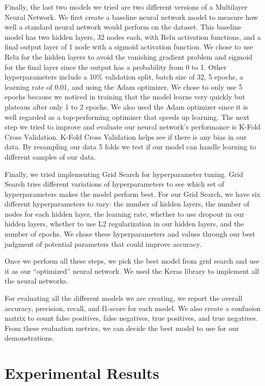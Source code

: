 \documentclass[a4paper]{article}
\begin{document}
Finally, the last two models we tried are two different versions of a Multilayer Neural Network. We first create a baseline neural network model to measure how well a standard neural network would perform on the dataset. This baseline model has two hidden layers, 32 nodes each, with Relu activation functions, and a final output layer of 1 node with a sigmoid activation function. We chose to use Relu for the hidden layers to avoid the vanishing gradient problem and sigmoid for the final layer since the output has a probability from 0 to 1. Other hyperparameters include a 10\% validation split, batch size of 32, 5 epochs, a learning rate of 0.01, and using the Adam optimizer. We chose to only use 5 epochs because we noticed in training that the model learns very quickly but plateaus after only 1 to 2 epochs. We also used the Adam optimizer since it is well regarded as a top-performing optimizer that speeds up learning.
The next step we tried to improve and evaluate our neural network’s performance is K-Fold Cross Validation. K-Fold Cross Validation helps see if there is any bias in our data. By resampling our data 5 folds we test if our model can handle learning to different samples of our data.

Finally, we tried implementing Grid Search for hyperparameter tuning. Grid Search tries different variations of hyperparameters to see which set of hyperparameters makes the model perform best. For our Grid Search, we have six different hyperparameters to vary: the number of hidden layers, the number of nodes for each hidden layer, the learning rate, whether to use dropout in our hidden layers, whether to use L2 regularization in our hidden layers, and the number of epochs. We chose these hyperparameters and values through our best judgment of potential parameters that could improve accuracy. 

Once we perform all these steps, we pick the best model from grid search and use it as our “optimized” neural network. We used the Keras library to implement all the neural networks.

For evaluating all the different models we are creating, we report the overall accuracy, precision, recall, and f1-score for each model. We also create a confusion matrix to count false positives, false negatives, true positives, and true negatives. From these evaluation metrics, we can decide the best model to use for our demonstrations. 


\section{Experimental Results}
\end{document}
